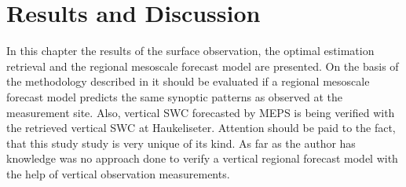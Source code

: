 \chapter{Results and Discussion} \label{ch:Res}
%
In this chapter the results of the surface observation, the optimal estimation retrieval and the regional mesoscale forecast model are presented. On the basis of the methodology described in  it should be evaluated if a regional mesoscale forecast model predicts the same synoptic patterns as observed at the measurement site. Also, vertical SWC forecasted by MEPS is being verified with the retrieved vertical SWC at Haukeliseter. Attention should be paid to the fact, that this study study is very unique of its kind. As far as the author has knowledge was no approach done to verify a vertical regional forecast model with the help of vertical observation measurements. 

